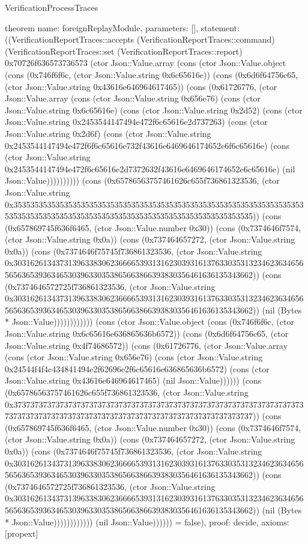 \begin{lexlean}{VerificationProcessTraces}
\begin{semanticmodule}
theorem{
  name: foreignReplayModule,
  parameters: [],
  statement: ((VerificationReportTraces::accepts (VerificationReportTraces::command) (VerificationReportTraces::set (VerificationReportTraces::report) 0x70726f636573736573 (ctor Json::Value.array (cons (ctor Json::Value.object (cons (0x746f6f6c, (ctor Json::Value.string 0x6c65616e)) (cons (0x6d6f64756c65, (ctor Json::Value.string 0x43616e646964617465)) (cons (0x61726776, (ctor Json::Value.array (cons (ctor Json::Value.string 0x656e76) (cons (ctor Json::Value.string 0x6c65616e) (cons (ctor Json::Value.string 0x2d52) (cons (ctor Json::Value.string 0x2453544147494e472f6c65616e2d737263) (cons (ctor Json::Value.string 0x2d6f) (cons (ctor Json::Value.string 0x2453544147494e472f6f6c65616e732f43616e6469646174652e6f6c65616e) (cons (ctor Json::Value.string 0x2453544147494e472f6c65616e2d7372632f43616e6469646174652e6c65616e) (nil Json::Value)))))))))) (cons (0x65786563757461626c655f736861323536, (ctor Json::Value.string 0x35353535353535353535353535353535353535353535353535353535353535353535353535353535353535353535353535353535353535353535353535353535)) (cons (0x657869745f636f6465, (ctor Json::Value.number 0x30)) (cons (0x7374646f7574, (ctor Json::Value.string 0x0a)) (cons (0x737464657272, (ctor Json::Value.string 0x0a)) (cons (0x7374646f75745f736861323536, (ctor Json::Value.string 0x30316261343731396338306236666539313162303931613763303531323462363465656563653936346530396330353865663866393830356461636135343662)) (cons (0x7374646572725f736861323536, (ctor Json::Value.string 0x30316261343731396338306236666539313162303931613763303531323462363465656563653936346530396330353865663866393830356461636135343662)) (nil (Bytes * Json::Value)))))))))))) (cons (ctor Json::Value.object (cons (0x746f6f6c, (ctor Json::Value.string 0x6c65616e636865636b6572)) (cons (0x6d6f64756c65, (ctor Json::Value.string 0x4f74686572)) (cons (0x61726776, (ctor Json::Value.array (cons (ctor Json::Value.string 0x656e76) (cons (ctor Json::Value.string 0x24544f4f4c434841494e2f62696e2f6c65616e636865636b6572) (cons (ctor Json::Value.string 0x43616e646964617465) (nil Json::Value)))))) (cons (0x65786563757461626c655f736861323536, (ctor Json::Value.string 0x37373737373737373737373737373737373737373737373737373737373737373737373737373737373737373737373737373737373737373737373737373737)) (cons (0x657869745f636f6465, (ctor Json::Value.number 0x30)) (cons (0x7374646f7574, (ctor Json::Value.string 0x0a)) (cons (0x737464657272, (ctor Json::Value.string 0x0a)) (cons (0x7374646f75745f736861323536, (ctor Json::Value.string 0x30316261343731396338306236666539313162303931613763303531323462363465656563653936346530396330353865663866393830356461636135343662)) (cons (0x7374646572725f736861323536, (ctor Json::Value.string 0x30316261343731396338306236666539313162303931613763303531323462363465656563653936346530396330353865663866393830356461636135343662)) (nil (Bytes * Json::Value)))))))))))) (nil Json::Value)))))) = false),
  proof: decide{},
  axioms: [propext]
}


\end{semanticmodule}
\end{lexlean}
